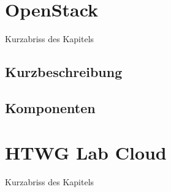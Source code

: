 


\newcommand{\thema}{HTWG Lab Cloud mit OpenStack}
\newcommand{\zusammenfassung}{Hier kommt eine kurze Zusammenfassung der Arbeit}

\newcommand{\ausgabedatum}{}
\newcommand{\abgabedatum}{}
\newcommand{\autor}{Dennis Parlak, Simon Kessler, Tobias Keh, Marco Grupe}
\newcommand{\autorStrasse}{}
\newcommand{\autorPLZ}{}
\newcommand{\autorOrt}{}
\newcommand{\autorGeburtsort}{}
\newcommand{\autorGeburtsdatum}{}
\newcommand{\prueferA}{Prof. Dr. Hanno Langweg}
\newcommand{\prueferB}{}
\newcommand{\firma}{}
\newcommand{\studiengang}{MSI Informatik}

\raggedbottom

\frontmatter


\setcounter{tocdepth}{1}
\tableofcontents 
\listoffigures
\listoftables
%
\mainmatter
{}
		
\chapter{OpenStack}

Kurzabriss des Kapitels

\section{Kurzbeschreibung}

\section{Komponenten}

\chapter{HTWG Lab Cloud}

Kurzabriss des Kapitels

